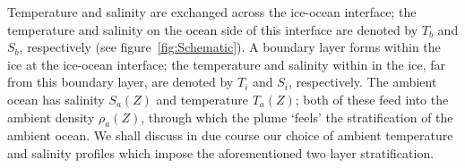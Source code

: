 \documentclass[openacc]{rsproca_new}%
\newcommand{\red}[1]{{\color{red} #1}}
\newcommand{\blue}[1]{{\color{blue} #1}}
\newcommand{\rout}[1]{\red{\st{#1}}}\newcommand{\ab}[1]{\textcolor{Green}{#1}}\newcommand{\about}[1]{\textcolor{Cyan}{\sout{#1}}}
\renewcommand{\rout}[1]{{}} %
\renewcommand{\blue}[1]{{\textcolor{black}{#1}}} %
\renewcommand{\red}[1]{{}} %
\begin{document}
Temperature and salinity are exchanged across the ice-ocean interface; the temperature and salinity on the \rout{plume} \blue{ocean} side of this interface are denoted by $T_b$ and $S_b$, respectively (see figure~\ref{fig:Schematic}). A boundary layer forms within the ice at the ice-ocean interface; the temperature and salinity within in the ice, far from this boundary layer, are denoted by $T_i$ and $S_i$, respectively. The ambient ocean has salinity $S_a(Z)$ and temperature $T_a(Z)$; both of these feed into the ambient density $\rho_a(Z)$, through which the plume `feels' the stratification of the ambient ocean.  We shall discuss in due course our choice of ambient temperature and salinity profiles which  impose the aforementioned two layer stratification. 

\rout{The plume is separated from the ice by a molecular sublayer, across which temperature and salinity are exchanged (inset in figure~\ref{fig:Schematic}); the salinity and temperature on the plume sides of this boundary layer are denoted by $S_b$ and $T_b$ respectively. The ambient ocean has salinity $S_a(Z)$ and temperature $T_a(Z)$, both of which feed into the ambient density $\rho_a(Z)$, through which the plume `feels' the stratification of the ambient ocean.  We shall discuss in due course our choice of ambient temperature and salinity, which permit us to impose the aforementioned two layer stratification. }
\end{document}

